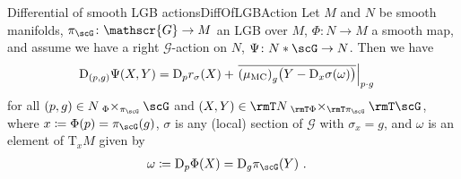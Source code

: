 \documentclass[reqno,a4paper,oneside]{amsart}
\newcommand\MC{\mu_{{\rm MC}}}
\newcommand\fibtimes[2]{\mathbin{_{#1}\times_{#2}}}
\theoremstyle{plain}
\theoremstyle{remark}
\theoremstyle{definition}
\def\ba#1\ea{\begin{align}#1\end{align}}
\def\bas#1\eas{\begin{align*}#1\end{align*}}
\begin{document}
\begin{propositions}{Differential of smooth LGB actions}{DiffOfLGBAction}
Let $M$ and $N$ be smooth manifolds, $\pi_\scG \colon \mathscr{G} \to M$ an LGB over $M$, $\Phi \colon N \to M$ a smooth map, and assume we have a right $\mathscr{G}$-action on $N$, $\Psi\colon N * \scG \to N$. Then we have
\begin{align*}
\mathrm{D}_{(p, g)}\Psi(X, Y)
&=
\mathrm{D}_pr_\sigma(X)
	+ \mleft.{\overline{\mleft( \MC\mright)_g \bigl(Y - \mathrm{D}_{x}\sigma (\omega)\bigr)}}\mright|_{p \cdot g}
\end{align*}
for all $(p, g) \in N \fibtimes\Phi{\pi_\scG} \scG$ and $(X, Y) \in \rmT N \fibtimes{\rmT\Phi}{\rmT\pi_\scG} \rmT \scG$, where $x \coloneqq \Phi(p) = \pi_\scG(g)$, $\sigma$ is any (local) section of $\mathscr{G}$ with $\sigma_{x} = g$, and $\omega$ is an element of $\mathrm{T}_xM$ given by
\begin{align*}
\omega
&\coloneqq
\mathrm{D}_p \Phi(X)
= 
\mathrm{D}_g\pi_\scG(Y)~.
\end{align*}
%
%
\end{propositions}
\end{document}
